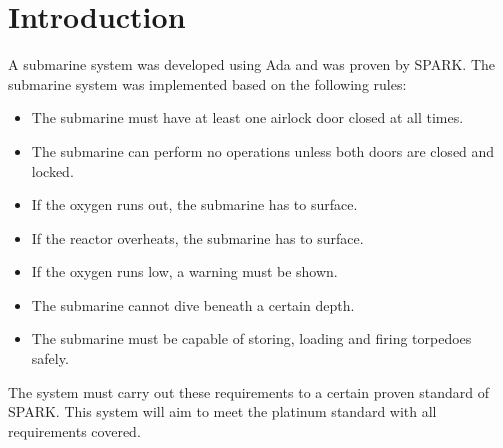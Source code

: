 \section{Introduction}\label{submarine}
A submarine system was developed using Ada and was proven by SPARK. The submarine system was implemented based on the following rules: 

\begin{itemize}
	\item The submarine must have at least one airlock door closed at all times.
	\item The submarine can perform no operations unless both doors are closed and
	locked.
	\item If the oxygen runs out, the submarine has to surface.
	\item If the reactor overheats, the submarine has to surface.
	\item If the oxygen runs low, a warning must be shown.
	\item The submarine cannot dive beneath a certain depth.
	\item The submarine must be capable of storing, loading and firing torpedoes
	safely.
\end{itemize}

The system must carry out these requirements to a certain proven standard of SPARK. This system will aim to meet the platinum standard with all requirements covered. 

